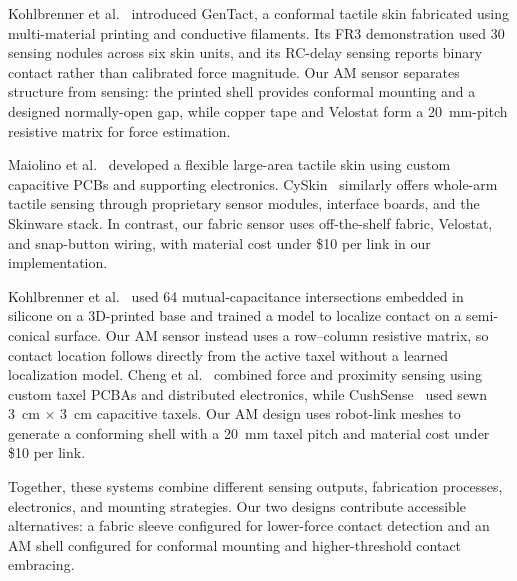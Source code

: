 Kohlbrenner et al.~\cite{kohlbrenner2025gentact} introduced GenTact, a conformal tactile skin fabricated using multi-material printing and conductive filaments. Its FR3 demonstration used 30 sensing nodules across six skin units, and its RC-delay sensing reports binary contact rather than calibrated force magnitude. Our AM sensor separates structure from sensing: the printed shell provides conformal mounting and a designed normally-open gap, while copper tape and Velostat form a 20~mm-pitch resistive matrix for force estimation.

Maiolino et al.~\cite{6502183} developed a flexible large-area tactile skin using custom capacitive PCBs and supporting electronics. CySkin~\cite{Cyskin} similarly offers whole-arm tactile sensing through proprietary sensor modules, interface boards, and the Skinware stack. In contrast, our fabric sensor uses off-the-shelf fabric, Velostat, and snap-button wiring, with material cost under \$10 per link in our implementation.

Kohlbrenner et al.~\cite{kohlbrenner2024machine} used 64 mutual-capacitance intersections embedded in silicone on a 3D-printed base and trained a model to localize contact on a semi-conical surface. Our AM sensor instead uses a row--column resistive matrix, so contact location follows directly from the active taxel without a learned localization model. Cheng et al.~\cite{8812712} combined force and proximity sensing using custom taxel PCBAs and distributed electronics, while CushSense~\cite{10610014} used sewn 3~cm $\times$ 3~cm capacitive taxels. Our AM design uses robot-link meshes to generate a conforming shell with a 20~mm taxel pitch and material cost under \$10 per link.

Together, these systems combine different sensing outputs, fabrication processes, electronics, and mounting strategies. Our two designs contribute accessible alternatives: a fabric sleeve configured for lower-force contact detection and an AM shell configured for conformal mounting and higher-threshold contact embracing.
